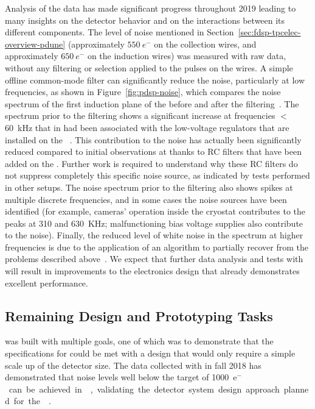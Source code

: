 Analysis of the  data has made significant progress throughout 2019 
leading to many insights on the detector behavior and on the interactions
between its different components. The level of noise mentioned in Section~\ref{sec:fdsp-tpcelec-overview-pdune}
(approximately $\SI{550}{e^-}$ on the collection wires,
and approximately $\SI{650}{e^-}$ on the induction wires) 
was measured with raw data, without any
filtering or selection applied to the pulses on the 
wires. A simple offline common-mode filter can significantly reduce the 
noise, particularly at low frequencies, as shown in Figure~\ref{fig:pdsp-noise},  
which compares the noise spectrum of the first induction plane of the 
before and after the filtering~\cite{pend_PDSP_PerfPaper}. The spectrum prior to the
filtering shows a significant increase at frequencies $<$\SI{60}{kHz} that in
 had been associated with the low-voltage regulators that are installed
on the ~\cite{Acciarri:2017sde}. This contribution to the noise
has actually been significantly reduced compared to initial observations at 
 thanks to RC filters that have been added
on the  . Further work is required to
understand why these RC filters do not suppress completely this
specific noise source, as indicated by tests performed in other setups.
The noise spectrum prior to the filtering also shows spikes at multiple 
discrete frequencies, and in some cases the noise sources have been 
identified (for example, cameras' operation inside the cryostat
contributes to the peaks at \num{310} and \SI{630}{KHz};
malfunctioning bias voltage supplies also contribute to the noise). Finally,
the reduced level of white noise in the spectrum at higher frequencies is
due to the application of an algorithm to partially recover from the 
problems described above~\cite{pend_PDSP_PerfPaper}. We
expect that further data analysis and tests with 
will result in improvements to the  electronics design that
already demonstrates excellent performance.

\subsection{Remaining Design and Prototyping Tasks}
\label{sec:fdsp-tpcelec-overview-remaining}

  was %
 built with multiple
goals, one of which was to demonstrate that the specifications
for  could be met with a design that would only require a simple
scale up of the detector size. The data collected with 
in fall 2018 has demonstrated that noise levels well below the target
of \SI{1000}{e$^-$} can be achieved in \lar, validating the
detector system design approach planned for the  .

